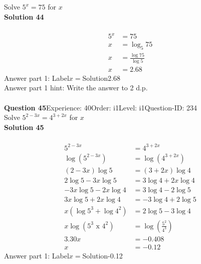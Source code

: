 \documentclass{article}
\begin{document}
Solve $5^x=75$ for $x$\\[4pt]
\noindent\textbf{Solution 44}\\[2pt]
\\[-35pt]\begin{align*}
5^x&=75\\[2pt]
x&=\log_{5}75\\[2pt]
x&=\displaystyle\frac{\log75}{\log5}\\[2pt]
x&=2.68
\end{align*}
Answer part 1: \hspace{10pt}Label\hspace{10pt}$x=$\hspace{10pt}Solution\hspace{10pt}2.68\\
Answer part 1 hint: \hspace{15pt}Write the answer to 2 d.p.\\
\\[4pt]
\noindent\textbf{Question 45}\hspace{20pt}Experience: 40\hspace{20pt}Order: i1\hspace{20pt}Level: i1\hspace{20pt}Question-ID: 234\\[2pt]
Solve $5^{2-3x}=4^{3+2x}$ for $x$\\[4pt]
\noindent\textbf{Solution 45}\\[2pt]
\\[-35pt]\begin{align*}
5^{2-3x}&=4^{3+2x}\\[2pt]
\log(5^{2-3x})&=\log(4^{3+2x})\\[2pt]
(2-3x)\log5&=(3+2x)\log4\\[2pt]
2\log5-3x\log5&=3\log4+2x\log4\\[2pt]
-3x\log5-2x\log4&=3\log4-2\log5\\[2pt]
3x\log5+2x\log4&=-3\log4+2\log5\\[2pt]
x(\log5^3+\log4^2)&=2\log5-3\log4\\[2pt]
x\log{(5^3\,\,\text{x}\,\,4^2)}&=\log\left(\displaystyle\frac{5^2}{4^3}\right)\\[2pt]
3.30x&=-0.408\\[2pt]
x&=-0.12
\end{align*}
Answer part 1: \hspace{10pt}Label\hspace{10pt}$x=$\hspace{10pt}Solution\hspace{10pt}-0.12\\
\end{document}
